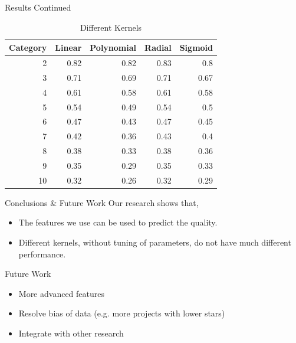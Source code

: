 \documentclass[presentation]{beamer}
\begin{document}
\begin{frame}{Results Continued}
  \begin{table}
    \centering
    \begin{tabular}{r|r|r|r|r}
      Category & Linear & Polynomial & Radial & Sigmoid\\
      \hline
      2 & 0.82 & 0.82 & 0.83 & 0.8\\
      3 & 0.71 & 0.69 & 0.71 & 0.67\\
      4 & 0.61 & 0.58 & 0.61 & 0.58\\
      5 & 0.54 & 0.49 & 0.54 & 0.5\\
      6 & 0.47 & 0.43 & 0.47 & 0.45\\
      7 & 0.42 & 0.36 & 0.43 & 0.4\\
      8 & 0.38 & 0.33 & 0.38 & 0.36\\
      9 & 0.35 & 0.29 & 0.35 & 0.33\\
      10 & 0.32 & 0.26 & 0.32 & 0.29\\
    \end{tabular}
    \caption{Different Kernels}
  \end{table}

\end{frame}

\begin{frame}{Conclusions \& Future Work}
  Our research shows that,
  \begin{itemize}
  \item The features we use can be used to predict the quality.
  \item Different kernels, without tuning of parameters, do not have
    much different performance.
  \end{itemize}

  Future Work
  \begin{itemize}
  \item More advanced features
  \item Resolve bias of data (e.g. more projects with lower stars)
  \item Integrate with other research
  \end{itemize}
\end{frame}
\end{document}
